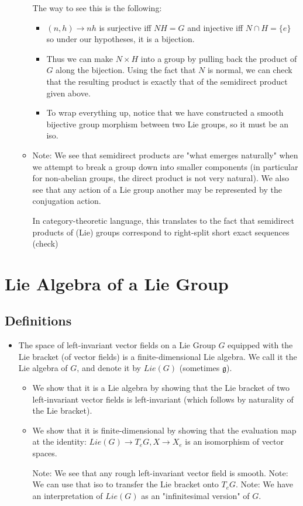 \documentclass{report}
\theoremstyle{definition}
\begin{document}
\begin{itemize}
\begin{itemize}
        The way to see this is the following:
        \begin{itemize}
            \item $(n,h)\to nh$ is surjective iff $NH=G$ and injective iff $N\cap H=\{e\}$ so under our hypotheses, it is a bijection.
            \item Thus we can make $N\times H$ into a group by pulling back the product of $G$ along the bijection. Using the fact that $N$ is normal, we can check that the resulting product is exactly that of the semidirect product given above.
            \item To wrap everything up, notice that we have constructed a smooth bijective group morphism between two Lie groups, so it must be an iso.
        \end{itemize}
        \item Note: We see that semidirect products are "what emerges naturally" when we attempt to break a group down into smaller components (in particular for non-abelian groups, the direct product is not very natural). We also see that any action of a Lie group another may be represented by the conjugation action.

        In category-theoretic language, this translates to the fact that semidirect products of (Lie) groups correspond to right-split short exact sequences (check)
    \end{itemize}
\end{itemize}

\section{Lie Algebra of a Lie Group}

\subsection{Definitions}

\begin{itemize}
    \item The space of left-invariant vector fields on a Lie Group $G$ equipped with the Lie bracket (of vector fields) is a finite-dimensional Lie algebra. We call it the Lie algebra of $G$, and denote it by $Lie(G)$ (sometimes $\mathfrak{g}$).

    \begin{itemize}
        \item We show that it is a Lie algebra by showing that the Lie bracket of two left-invariant vector fields is left-invariant (which follows by naturality of the Lie bracket).
        \item We show that it is finite-dimensional by showing that the evaluation map at the identity: $Lie(G)\to T_eG,X\to X_e$ is an isomorphism of vector spaces.

        Note: We see that any rough left-invariant vector field is smooth.
        Note: We can use that iso to transfer the Lie bracket onto $T_eG$.
        Note: We have an interpretation of $Lie(G)$ as an "infinitesimal version" of $G$.
    \end{itemize}
\end{itemize}
\end{document}
